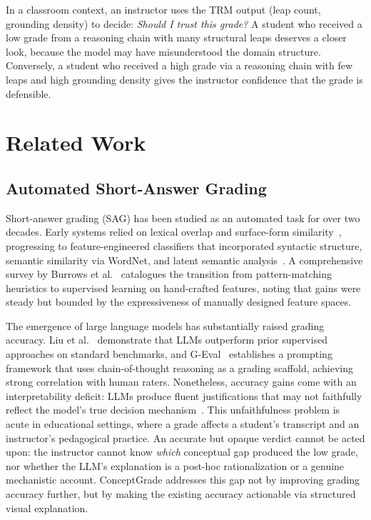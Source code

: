 \documentclass[journal,review]{vgtc}
\begin{document}
In a classroom context, an instructor uses the TRM output (leap count, grounding density) to decide: \textit{Should I trust this grade?} A student who received a low grade from a reasoning chain with many structural leaps deserves a closer look, because the model may have misunderstood the domain structure. Conversely, a student who received a high grade via a reasoning chain with few leaps and high grounding density gives the instructor confidence that the grade is defensible.

\section{Related Work} \label{sec:related_work}

\subsection{Automated Short-Answer Grading}

Short-answer grading (SAG) has been studied as an automated task for over two decades. Early systems relied on lexical overlap and surface-form similarity~\cite{Leacock2003}, progressing to feature-engineered classifiers that incorporated syntactic structure, semantic similarity via WordNet, and latent semantic analysis~\cite{Mohler2011}. A comprehensive survey by Burrows et al.~\cite{Burrows2015} catalogues the transition from pattern-matching heuristics to supervised learning on hand-crafted features, noting that gains were steady but bounded by the expressiveness of manually designed feature spaces.

The emergence of large language models has substantially raised grading accuracy. Liu et al.~\cite{Liu2024} demonstrate that LLMs outperform prior supervised approaches on standard benchmarks, and G-Eval~\cite{Wei2023_GEVAL} establishes a prompting framework that uses chain-of-thought reasoning as a grading scaffold, achieving strong correlation with human raters. Nonetheless, accuracy gains come with an interpretability deficit: LLMs produce fluent justifications that may not faithfully reflect the model's true decision mechanism~\cite{Turpin2023,Lanham2023}. This unfaithfulness problem is acute in educational settings, where a grade affects a student's transcript and an instructor's pedagogical practice. An accurate but opaque verdict cannot be acted upon: the instructor cannot know \textit{which} conceptual gap produced the low grade, nor whether the LLM's explanation is a post-hoc rationalization or a genuine mechanistic account. ConceptGrade addresses this gap not by improving grading accuracy further, but by making the existing accuracy actionable via structured visual explanation.
\end{document}

